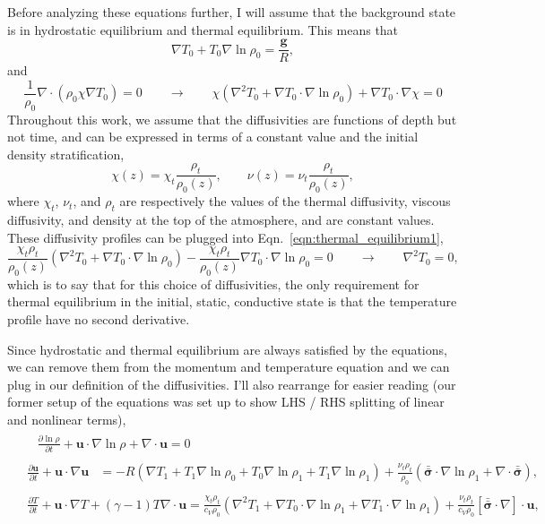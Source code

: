 \documentclass[aps, pre, onecolumn, nofootinbib, notitlepage, groupedaddress, amsfonts, amssymb, amsmath, longbibliography, superscriptaddress]{revtex4-1}
\newcommand{\grad}{\ensuremath{\nabla}}
\newcommand{\lilstressT}{\ensuremath{\bm{\bar{\bar{\sigma}}}}}
\begin{document}
Before analyzing these equations further, I will assume that the background state is in hydrostatic equilibrium and thermal equilibrium.
This means that
\begin{equation}
\grad T_0 + T_0\grad\ln\rho_0 = \frac{\bm{g}}{R},
\label{eqn:hydrostatic_equilibrium1}
\end{equation}
and
\begin{equation}
\frac{1}{\rho_0}\grad\cdot(\rho_0\chi\grad T_0) = 0 \qquad\rightarrow\qquad
\chi (\grad^2 T_0 + \grad T_0 \cdot\grad\ln\rho_0) + \grad T_0 \cdot\grad\chi  = 0
\label{eqn:thermal_equilibrium1}
\end{equation}
Throughout this work, we assume that the diffusivities are functions of depth but not time, and can be expressed in terms of a constant value and the initial density stratification,
$$
\chi(z) = \chi_t \frac{\rho_t}{\rho_0(z)}, \qquad
\nu(z)  = \nu_t  \frac{\rho_t}{\rho_0(z)},
$$
where $\chi_t$, $\nu_t$, and $\rho_t$ are respectively the values of the thermal diffusivity, viscous diffusivity, and density at the top of the atmosphere, and are constant values.
These diffusivity profiles can be plugged into Eqn.~\ref{eqn:thermal_equilibrium1},
$$
\frac{\chi_t\rho_t}{\rho_0(z)}(\grad^2 T_0 + \grad T_0 \cdot \grad\ln\rho_0) - \frac{\chi_t\rho_t}{\rho_0(z)}\grad T_0 \cdot\grad\ln\rho_0 = 0
\qquad\rightarrow\qquad
\grad^2 T_0 = 0,
$$
which is to say that for this choice of diffusivities, the only requirement for thermal equilibrium in the initial, static, conductive state is that the temperature profile have no second derivative.

Since hydrostatic and thermal equilibrium are always satisfied by the equations, we can remove them from the momentum and temperature equation and we can plug in our definition of the diffusivities.
I'll also rearrange for easier reading (our former setup of the equations was set up to show LHS / RHS splitting of linear and nonlinear terms),
\begin{align}
&\begin{aligned}
&\frac{\partial \ln\rho}{\partial t} + \bm{u}\cdot\grad\ln\rho + \grad\cdot\bm{u}  = 0
	\label{eqn:ab17continuity_eqn2}
\end{aligned}\\
&\begin{aligned}
\frac{\partial\bm{u}}{\partial t} + \bm{u}\cdot\grad\bm{u}
&= - R (\grad T_1 + T_1\grad\ln\rho_0 + T_0\grad\ln\rho_1 + T_1 \grad\ln\rho_1)
+ \frac{\nu_t\rho_t}{\rho_0}\left(\lilstressT\cdot\grad\ln\rho_1 + \grad\cdot\lilstressT\right),
\label{eqn:ab17momentum_eqn2}
\end{aligned}\\
&\begin{aligned}
\frac{\partial T}{\partial t} + \bm{u}\cdot\grad T + (\gamma-1)T\grad\cdot\bm{u}
=	\frac{\chi_t\rho_t}{c_V\rho_0}(\grad^2 T_1 + \grad T_0\cdot\grad\ln\rho_1 + \grad T_1\cdot\grad\ln\rho_1)
	+ \frac{\nu_t\rho_t }{c_V\rho_0}[\lilstressT\cdot\nabla]\cdot\bm{u}, 
	\label{eqn:ab17energy_eqn2}
\end{aligned}
\end{align}
\end{document}
